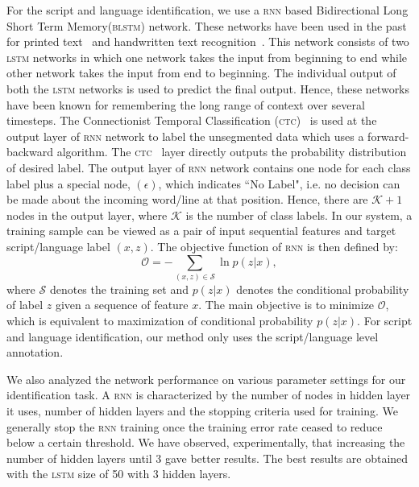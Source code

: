 For the script and language identification, we use a \textsc{rnn} based Bidirectional Long Short Term Memory(\textsc{blstm}) network. These networks have been used in the past for  printed text~\cite{PraveenDAS} and handwritten text recognition~\cite{GravesLFBBS09}. This network consists of two \textsc{lstm} networks in which one network takes the input from beginning to end while other network takes the input from end to beginning. The individual output of both the \textsc{lstm} networks is used to predict the final output. Hence, these networks have been known for remembering the long range of context over several timesteps. The Connectionist Temporal Classification (\textsc{ctc})~\cite{GravesFGS06} is used at the output layer of \textsc{rnn} network to label the unsegmented data which uses a forward-backward algorithm. The \textsc{ctc}~\cite{GravesFGS06} layer directly outputs the probability distribution of desired label. The output layer of \textsc{rnn} network contains one node for each class label plus a special node, $(\epsilon)$, which indicates ``No Label", i.e. no decision can be made about the incoming word/line at that position. Hence, there are $\mathcal{K}+1$ nodes in the output layer, where $\mathcal{K}$ is the number of class labels. In our system, a training sample can be viewed as a pair of input sequential features and target script/language label $(x, z)$. The objective function of \textsc{rnn} is then defined by:
\begin{equation}
\mathcal{O} = - \sum_{(x,z) \in \mathcal{S}} \ln p(z|x) ,
\end{equation}
where $\mathcal{S}$ denotes the training set and $p(z|x)$ denotes the conditional probability of label $z$ given a sequence of feature $x$. The main objective is to minimize $\mathcal{O}$, which is equivalent to maximization of conditional probability $p(z|x)$. For script and language identification, our method only uses the script/language level annotation. %

We also analyzed the network performance on various parameter settings for our identification task. A \textsc{rnn} is characterized by the number of nodes in hidden layer it uses, number of hidden layers and the stopping criteria used for training. We generally stop the \textsc{rnn} training once the training error rate ceased to reduce below a certain threshold. We have observed, experimentally, that increasing the number of hidden layers until 3 gave better results. The best results are obtained with the \textsc{lstm} size of 50 with 3 hidden layers.

